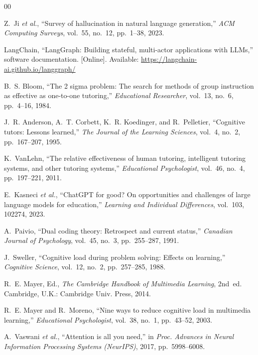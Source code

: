 \documentclass[conference]{IEEEtran}
\begin{document}
\begin{thebibliography}{00}

 Z.~Ji \emph{et al.}, ``Survey of hallucination in
natural language generation,'' \emph{ACM Computing Surveys}, vol.~55, no.~12,
pp.~1--38, 2023.

 LangChain, ``LangGraph: Building stateful, multi-actor
applications with LLMs,'' software documentation. [Online]. Available:
\url{https://langchain-ai.github.io/langgraph/}

 B.~S. Bloom, ``The 2 sigma problem: The search for methods
of group instruction as effective as one-to-one tutoring,'' \emph{Educational
Researcher}, vol.~13, no.~6, pp.~4--16, 1984.

 J.~R. Anderson, A.~T. Corbett, K.~R. Koedinger,
and R.~Pelletier, ``Cognitive tutors: Lessons learned,'' \emph{The Journal of
the Learning Sciences}, vol.~4, no.~2, pp.~167--207, 1995.

 K.~VanLehn, ``The relative effectiveness of human
tutoring, intelligent tutoring systems, and other tutoring systems,''
\emph{Educational Psychologist}, vol.~46, no.~4, pp.~197--221, 2011.

 E.~Kasneci \emph{et al.}, ``ChatGPT for good? On
opportunities and challenges of large language models for education,''
\emph{Learning and Individual Differences}, vol.~103, 102274, 2023.

 A.~Paivio, ``Dual coding theory: Retrospect and current
status,'' \emph{Canadian Journal of Psychology}, vol.~45, no.~3, pp.~255--287,
1991.

 J.~Sweller, ``Cognitive load during problem solving:
Effects on learning,'' \emph{Cognitive Science}, vol.~12, no.~2, pp.~257--285,
1988.

 R.~E. Mayer, Ed., \emph{The Cambridge Handbook of
Multimedia Learning}, 2nd~ed. Cambridge, U.K.: Cambridge Univ. Press, 2014.

 R.~E. Mayer and R.~Moreno, ``Nine ways to reduce
cognitive load in multimedia learning,'' \emph{Educational Psychologist},
vol.~38, no.~1, pp.~43--52, 2003.

 A.~Vaswani \emph{et al.}, ``Attention is all you
need,'' in \emph{Proc. Advances in Neural Information Processing Systems
(NeurIPS)}, 2017, pp.~5998--6008.


\end{thebibliography}
\end{document}
